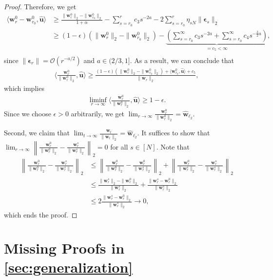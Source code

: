 \documentclass{article} %
\theoremstyle{plain}
\theoremstyle{definition}
\theoremstyle{remark}
\def\bignorm#1{\left\lVert#1\right\rVert}
\def\bigopen#1{\left(#1\right)}
\def\bu{{\mathbf u}}
\def\bw{{\mathbf w}}
\begin{document}
\begin{proof}
    Therefore, we get
    \begin{align*}
        \langle\bw_r^0-\bw_{r_0}^0, \hat{\bu} \rangle  &\geq \frac{\|\bw_r^0\|_2 - \|\bw_{r_0}^0\|_2}{1+\alpha} - \sum_{s=r_0}^rc_3s^{-2a} - 2\sum_{s=r_0}^r \eta_{sN} \|\boldsymbol{\epsilon}_s\|_2 \\
        &\geq (1-\epsilon)(\|\bw_r^0\|_2 - \|\bw_{r_0}^0\|_2) - \underbrace{\bigopen{\sum_{s=r_0}^\infty c_3s^{-2a} + \sum_{s=r_0}^\infty c_4 s^{-\frac{3}{2}a}}}_{=c_5<\infty}, \\
    \end{align*}
    since $\|\boldsymbol{\epsilon}_r\|=\mathcal{O}(r^{-a/2})$ and $a \in (2/3, 1]$.
    As a result, we can conclude that
    \begin{align*}
        \langle\frac{\bw_r^0}{\|\bw_r^0\|_2}, \hat{\bu} \rangle \geq \frac{(1-\epsilon)(\|\bw_r^0\|_2 - \|\bw_{r_0}^0\|_2) + \langle \bw_{r_0}^0, \hat{\bu} \rangle + c_5}{\|\bw_{r}\|_2},
    \end{align*}
    which implies
    \begin{align*}
        \liminf_{r \rightarrow \infty}\langle\frac{\bw_r^0}{\|\bw_r^0\|_2}, \hat{\bu} \rangle \geq 1-\epsilon.
    \end{align*}
    Since we choose $\epsilon>0$ arbitrarily, we get $\lim_{r\rightarrow\infty}\frac{\bw_r^0}{\|\bw_r^0\|_2} = \hat{\bw}_{\ell_2}$.
    
    Second, we claim that $\lim_{t\rightarrow\infty}\frac{\bw_t}{\|\bw_t\|_2} = \hat{\bw}_{\ell_2}$. It suffices to show that $\lim_{r\rightarrow\infty} \bignorm{\frac{\bw_r^0}{\|\bw_r^0\|_2} - \frac{\bw_r^s}{\|\bw_r^s\|_2}}_2=0$ for all $s \in [N]$. Note that
    \begin{align*}
        \bignorm{\frac{\bw_r^0}{\|\bw_r^0\|_2} - \frac{\bw_r^s}{\|\bw_r^s\|_2}}_2 &\leq \bignorm{\frac{\bw_r^0}{\|\bw_r^0\|_2} - \frac{\bw_r^0}{\|\bw_r^s\|_2}}_2 + \bignorm{\frac{\bw_r^0}{\|\bw_r^s\|_2} - \frac{\bw_r^s}{\|\bw_r^s\|_2}}_2 \\
        &\leq \frac{\|\bw_r^s\|_2-\|\bw_r^0\|_2}{\|\bw_r^s\|_2} + \frac{\|\bw_r^s-\bw_r^0\|_2}{\|\bw_r^s\|_2} \\
        &\leq 2\frac{\|\bw_r^s-\bw_r^0\|_2}{\|\bw_r^s\|_2} \rightarrow 0,
    \end{align*}
    which ends the proof.
\end{proof}

\section[Missing Proofs in Section \ref{sec:generalization}]{Missing Proofs in \cref{sec:generalization}}\label{appendix:generalization}
\end{document}
